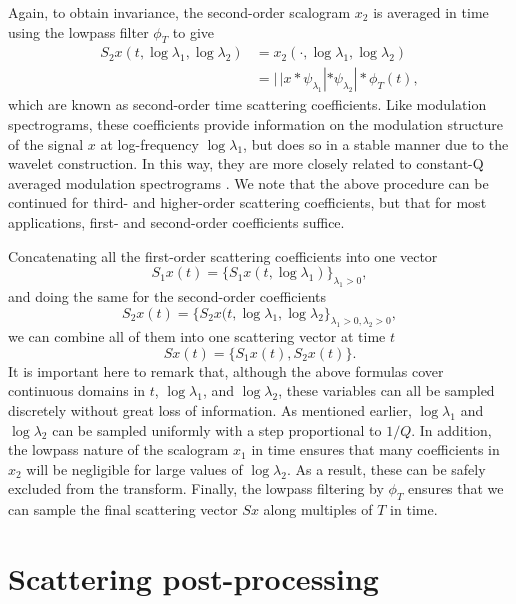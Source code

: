 \documentclass{article}
\newcommand{\lau}{{\lambda_1}}
\newcommand{\lad}{{\lambda_2}}
\begin{document}
\begin{sloppy}
Again, to obtain invariance, the second-order scalogram $x_2$ is averaged in time using the lowpass filter $\phi_T$ to give
\begin{align}
	\nonumber
	S_2 x(t, \log \lau, \log \lad) &= x_2(\cdot, \log \lau, \log \lad) \\
	&= |\,| x \ast \psi_\lau | \ast \psi_\lad | \ast \phi_T(t),
\end{align}
which are known as second-order time scattering coefficients. Like modulation spectrograms, these coefficients provide information on the modulation structure of the signal $x$ at log-frequency $\log \lau$, but does so in a stable manner due to the wavelet construction. In this way, they are more closely related to constant-Q averaged modulation spectrograms \cite{ellis-mcdermott}. We note that the above procedure can be continued for third- and higher-order scattering coefficients, but that for most applications, first- and second-order coefficients suffice.

Concatenating all the first-order scattering coefficients into one vector
\begin{equation}
	S_1x(t) = \{S_1x(t, \log \lau)\}_{\lau>0},
\end{equation}
and doing the same for the second-order coefficients
\begin{equation}
	S_2x(t) = \{S_2x(t, \log \lau, \log \lad\}_{\lau>0, \lad>0},
\end{equation}
we can combine all of them into one scattering vector at time $t$
\begin{equation}
	Sx(t) = \{S_1x(t), S_2x(t)\}.
\end{equation}
It is important here to remark that, although the above formulas cover continuous domains in $t$, $\log \lau$, and $\log \lad$, these variables can all be sampled discretely without great loss of information. As mentioned earlier, $\log \lau$ and $\log \lad$ can be sampled uniformly with a step proportional to $1/Q$. In addition, the lowpass nature of the scalogram $x_1$ in time ensures that many coefficients in $x_2$ will be negligible for large values of $\log \lad$. As a result, these can be safely excluded from the transform. Finally, the lowpass filtering by $\phi_T$ ensures that we can sample the final scattering vector $Sx$ along multiples of $T$ in time.

\section{Scattering post-processing}


\end{sloppy}
\end{document}

